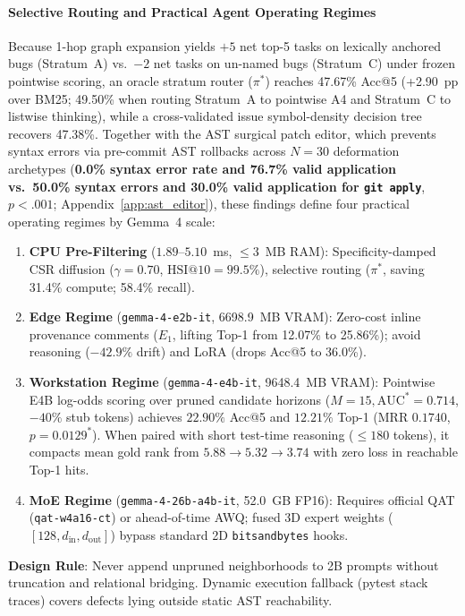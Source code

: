 \documentclass[10pt]{article}
\begin{document}
\paragraph{Selective Routing and Practical Agent Operating Regimes}
Because 1-hop graph expansion yields $+5$ net top-5 tasks on lexically anchored bugs (Stratum~A) vs.\ $-2$ net tasks on un-named bugs (Stratum~C) under frozen pointwise scoring, an oracle stratum router ($\pi^*$) reaches 47.67\% Acc@5 (+2.90~pp over BM25; 49.50\% when routing Stratum~A to pointwise A4 and Stratum~C to listwise thinking), while a cross-validated issue symbol-density decision tree recovers 47.38\%. Together with the AST surgical patch editor, which prevents syntax errors via pre-commit AST rollbacks across $N=30$ deformation archetypes (\textbf{0.0\% syntax error rate and 76.7\% valid application vs.\ 50.0\% syntax errors and 30.0\% valid application for \texttt{git apply}}, $p < .001$; Appendix~\ref{app:ast_editor}), these findings define four practical operating regimes by Gemma~4 scale:
\begin{enumerate}[noitemsep,topsep=1pt,parsep=0pt,partopsep=0pt]\sloppy
    \item \textbf{CPU Pre-Filtering} ($1.89\text{--}5.10$~ms, $\le 3$~MB RAM): Specificity-damped CSR diffusion ($\gamma=0.70$, $\text{HSI@10}=99.5\%$), selective routing ($\pi^*$, saving 31.4\% compute; 58.4\% recall).
    \item \textbf{Edge Regime} (\texttt{gemma-4-e2b-it}, 6698.9~MB VRAM): Zero-cost inline provenance comments ($E_1$, lifting Top-1 from 12.07\% to 25.86\%); avoid reasoning ($-42.9\%$ drift) and LoRA (drops Acc@5 to 36.0\%).
    \item \textbf{Workstation Regime} (\texttt{gemma-4-e4b-it}, 9648.4~MB VRAM): Pointwise E4B log-odds scoring over pruned candidate horizons ($M=15, \text{AUC}^*=0.714$, $-40\%$ stub tokens) achieves $22.90\%$ Acc@5 and $12.21\%$ Top-1 (MRR $0.1740$, $p=0.0129^*$). When paired with short test-time reasoning ($\le 180$ tokens), it compacts mean gold rank from $5.88 \to 5.32 \to 3.74$ with zero loss in reachable Top-1 hits.
    \item \textbf{MoE Regime} (\texttt{gemma-4-26b-a4b-it}, 52.0~GB FP16): Requires official QAT (\texttt{qat-w4a16-ct}) or ahead-of-time AWQ; fused 3D expert weights ($[128, d_{\text{in}}, d_{\text{out}}]$) bypass standard 2D \texttt{bitsandbytes} hooks.
\end{enumerate}
\textbf{Design Rule}: Never append unpruned neighborhoods to 2B prompts without truncation and relational bridging. Dynamic execution fallback (pytest stack traces) covers defects lying outside static AST reachability.
\end{document}
